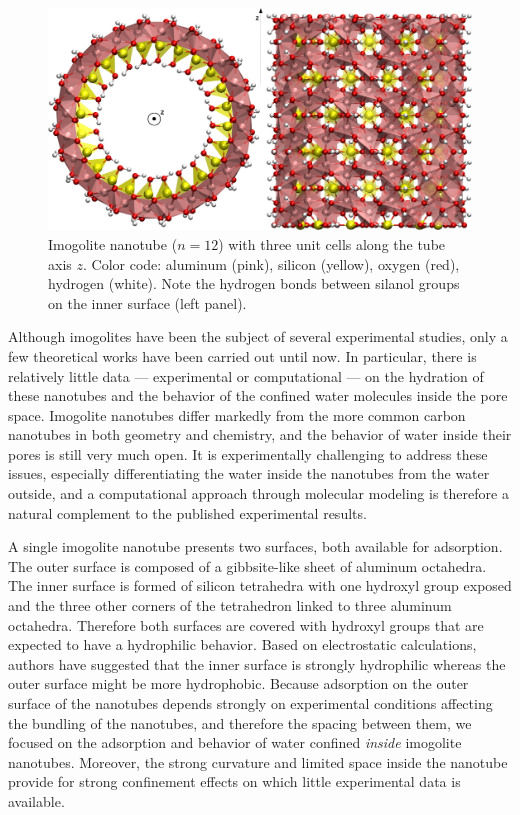 \documentclass[thesis]{subfiles}
\begin{document}
\begin{figure}[b]
    \centering
    \includegraphics[width=\textwidth]{figures/images/imogolite}
    \caption{Imogolite nanotube ($n=12$) with three unit cells along the tube
    axis $z$. Color code: aluminum (pink), silicon (yellow), oxygen (red),
    hydrogen (white). Note the hydrogen bonds between silanol groups on the
    inner surface (left panel).}
    \label{fig:imogolite:structure}
\end{figure}

Although imogolites have been the subject of several experimental studies, only
a few theoretical works have been carried out until now. In particular, there is
relatively little data --- experimental or computational --- on the hydration of
these nanotubes and the behavior of the confined water molecules inside the pore
space. Imogolite nanotubes differ markedly from the more common carbon nanotubes
in both geometry and chemistry, and the behavior of water inside their pores is
still very much open. It is experimentally challenging to address these issues,
especially differentiating the water inside the nanotubes from the water
outside, and a computational approach through molecular modeling is therefore a
natural complement to the published experimental results.

A single imogolite nanotube presents two surfaces, both available for
adsorption. The outer surface is composed of a gibbsite-like sheet of aluminum
octahedra. The inner surface is formed of silicon tetrahedra with one hydroxyl
group exposed and the three other corners of the tetrahedron linked to three
aluminum octahedra. Therefore both surfaces are covered with hydroxyl groups
that are expected to have a hydrophilic behavior. Based on electrostatic
calculations, authors have suggested that the inner surface is strongly
hydrophilic whereas the outer surface might be more
hydrophobic\cite{Gustafsson2001,Guimaraes2007}. Because adsorption on the outer
surface of the nanotubes depends strongly on experimental conditions affecting
the bundling of the nanotubes, and therefore the spacing between them, we
focused on the adsorption and behavior of water confined \emph{inside} imogolite
nanotubes. Moreover, the strong curvature and limited space inside the nanotube
provide for strong confinement effects on which little experimental data is
available.
\end{document}
